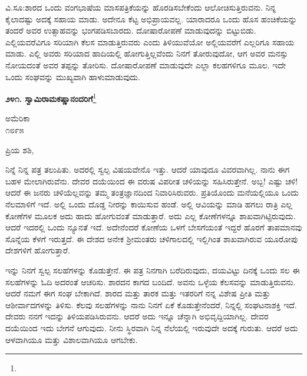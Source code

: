 ವಿ.ಸೂ:\enginline{-}ಶಾರದ ಒಂದು ವಂಗಭಾಷೆಯ ಮಾಸಪತ್ರಿಕೆಯನ್ನು ಹೊರಡಿಸಬೇಕೆಂದು ಆಲೋಚಿಸುತ್ತಿರುವನು. ನಿನ್ನ ಕೈಲಾದಷ್ಟು ಅದಕ್ಕೆ ಸಹಾಯ ಮಾಡು. ಅದೇನೂ ಕೆಟ್ಟ ಅಭಿಪ್ರಾಯವಲ್ಲ. ಯಾರಾದರೂ ಒಂದು ಹೊಸ ಹಂಚಿಕೆಯನ್ನು ತಂದರೆ ಅವರ ಉತ್ಸಾಹವನ್ನು ಭಂಗಪಡಿಸಬಾರದು. ದೋಷಾರೋಪಣೆ ಮಾಡುವುದನ್ನು ಬಿಟ್ಟುಬಿಡು. ಎಲ್ಲಿಯವರೆವಿಗೂ ಸರಿಯಾಗಿ ಕೆಲಸ ಮಾಡುತ್ತಿರುವರು ಎಂದು ತಿಳಿಯುವೆಯೋ ಅಲ್ಲಿಯವರೆಗೆ ಎಲ್ಲರಿಗೂ ಸಹಾಯ ಮಾಡು. ಎಲ್ಲಿ ಅವರು ಸರಿಯಾದ ಹಾದಿಯಲ್ಲಿ ಹೋಗುತ್ತಿಲ್ಲವೆಂದು ನಿನಗೆ ತೋರುವುದೋ, ಆಗ ಅವರ ಮನಸ್ಸು ನೋಯದಂತೆ ಅವರ ತಪ್ಪನ್ನು ತೋರಿಸು. ದೋಷಾರೋಪಣೆ ಮಾಡುವುದೇ ಎಲ್ಲಾ ಕಲಹಗಳಿಗೂ ಮೂಲ. ಇದೇ ಒಂದು ಸಂಘವನ್ನು ಮುಖ್ಯವಾಗಿ ಹಾಳುಮಾಡುವುದು.

\begin{center}
\textbf{೨೪೧. ಸ್ವಾಮಿರಾಮಕಷ್ಣಾನಂದರಿಗೆ}\footnote{}
\end{center}

\vspace{-0.5cm}

\begin{flushright}
ಅಮೆರಿಕಾ\\೧೮೯೫
\end{flushright}

\vspace{-0.3cm}

\noindent
ಪ್ರಿಯ ಶಶಿ,

ನಿನ್ನೆ ನಿನ್ನ ಪತ್ರ ತಲುಪಿತು. ಅದರಲ್ಲಿ ಸ್ವಲ್ಪ ವಿಷಯವೇನೊ ಇತ್ತು. ಆದರೆ ಯಾವುದೂ ವಿವರವಾಗಿಲ್ಲ. ನಾನು ಈಗ ಬಹಳ ಮೇಲಾಗಿರುವೆನು. ದೇವರ ದಯೆಯಿಂದ ಈ ವರುಷ ವಿಪರೀತ ಚಳಿಯನ್ನು ಸಹಿಸಿರುತ್ತೇನೆ. ಅಬ್ಬ! ಎಷ್ಟು ಚಳಿ! ಆದರೆ ಈ ಜನರು ಚಳಿಯೆಲ್ಲವನ್ನು ತಮ್ಮ ತಂತ್ರಜ್ಞಾನದಿಂದ ನಿವಾರಿಸಿರುವರು. ಪ್ರತಿಯೊಂದು ಮನೆಯಲ್ಲಿಯೂ ಒಂದು ನೆಲಮಾಳಿಗೆ ಇದೆ. ಅಲ್ಲಿ ಒಂದು ದೊಡ್ಡ ನೀರನ್ನು ಕಾಯಿಸುವ ಹಂಡೆ. ಅಲ್ಲಿ ಆವಿಯನ್ನು ಮಾಡಿ ಹಗಲು ರಾತ್ರಿ ಎಲ್ಲ ಕೋಣೆಗಳ ಮೂಲಕ ಅದು ಹಾದು ಹೋಗುವಂತೆ ಮಾಡುತ್ತಾರೆ. ಅದು ಎಲ್ಲ ಕೋಣೆಗಳನ್ನೂ ಶಾಖವಾಗಿಟ್ಟಿರುವುದು. ಆದರೆ ಇದರಲ್ಲಿ ಒಂದು ನ್ಯೂನತೆ ಇದೆ. ಅದೇನೆಂದರೆ ಕೋಣೆಯ ಒಳಗೆ ಬೇಸಗೆಯಂತೆ ಇದ್ದರೆ ಹೊರಗೆ ತಾಪಮಾನವು ಸೊನ್ನೆಯ ಕೆಳಗೆ ಇರುತ್ತದೆ. ಈ ದೇಶದ ಅನೇಕ ಶ‍್ರೀಮಂತರು ಚಳಿಗಾಲದಲ್ಲಿ ಇಲ್ಲಿಗಿಂತ ಶಾಖವಾಗಿರುವ ಯೂರೋಪು ದೇಶಗಳಿಗೆ ಹೋಗುತ್ತಾರೆ.

ಇನ್ನು ನಿನಗೆ ಸ್ವಲ್ಪ ಸಲಹೆಗಳನ್ನು ಕೊಡುತ್ತೇನೆ. ಈ ಪತ್ರ ನಿನಗಾಗಿ ಬರೆದಿರುವುದು, ದಯವಿಟ್ಟು ದಿನಕ್ಕೆ ಒಂದು ಸಲ ಈ ಸಲಹೆಗಳನ್ನು ಓದಿ ಅದರಂತೆ ಆಚರಿಸು. ಶಾರದನ ಕಾಗದ ಬಂದಿದೆ. ಅವನು ಒಳ್ಳೆಯ ಕೆಲಸವನ್ನು ಮಾಡುತ್ತಿರುವನು. ಆದರೆ ನಮಗೆ ಈಗ ಸಂಘ ಬೇಕಾಗಿದೆ. ಶಾರದ ಮತ್ತು ತಾರಕ ಮತ್ತು ಇತರರಿಗೆ ನನ್ನ ವಿಶೇಷ ಪ್ರೀತಿ ಮತ್ತು ಆಶೀರ್ವಾದಗಳನ್ನು ತಿಳಿಸು. ಕೆಲವು ಸಲಹೆಗಳನ್ನು ನಾನು ನಿನಗೆ ಏಕೆ ಕೊಡುತ್ತೇನೆಂದರೆ, ನಿನ್ನಲ್ಲಿ ಸಂಘಟನಾಶಕ್ತಿ ಇದೆ. ದೇವರು ನನಗೆ ಇದನ್ನು ತಿಳಿಯಪಡಿಸಿರುವನು. ಆದರೆ ಅದು ಇನ್ನೂ ಚೆನ್ನಾಗಿ ಅಭಿವೃದ್ದಿಯಾಗಿಲ್ಲ. ದೇವರ ದಯೆಯಿಂದ ಇದು ಬೇಗನೆ ಆಗುವುದು. ನೀನು ಸ್ಥಿರವಾಗಿ ನಿನ್ನ ನೆಲೆಯಲ್ಲಿ ಇರುವುದೇ ಅದಕ್ಕೆ ಗುರುತು. ಆದರೆ ಅದು ಆಳವಾಗಿಯೂ ಮತ್ತು ವಿಶಾಲವಾಗಿಯೂ ಆಗಬೇಕು.

\vspace{0.1cm}


